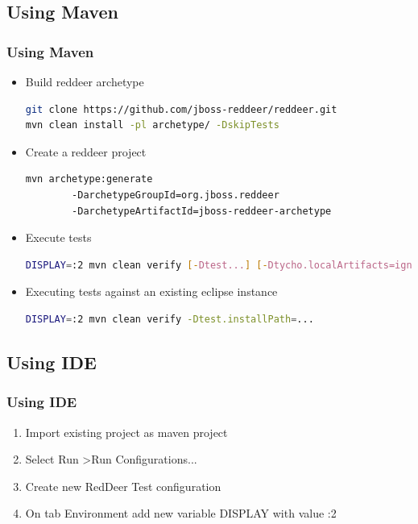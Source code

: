 \documentclass{beamer}
\begin{document}
\subsection{Using Maven}
\begin{frame}[fragile]
\frametitle{Using Maven}
\begin{itemize}
\item Build reddeer archetype
\begin{lstlisting}[language=sh]
git clone https://github.com/jboss-reddeer/reddeer.git
mvn clean install -pl archetype/ -DskipTests
\end{lstlisting}
\item Create a reddeer project
\begin{lstlisting}[language=sh]
mvn archetype:generate 
        -DarchetypeGroupId=org.jboss.reddeer
        -DarchetypeArtifactId=jboss-reddeer-archetype
\end{lstlisting}
\item Execute tests
\begin{lstlisting}[language=sh]
DISPLAY=:2 mvn clean verify [-Dtest...] [-Dtycho.localArtifacts=ignore]
\end{lstlisting}
\item Executing tests against an existing eclipse instance
\begin{lstlisting}[language=sh]
DISPLAY=:2 mvn clean verify -Dtest.installPath=...
\end{lstlisting}
\end{itemize}
\end{frame}

\subsection{Using IDE}
\begin{frame}[fragile]
\frametitle{Using IDE}
\begin{enumerate}
\item Import existing project as maven project
\item Select Run \textgreater Run Configurations...
\item Create new RedDeer Test configuration
\item On tab Environment add new variable DISPLAY with value :2
\end{enumerate}
\end{frame}
\end{document}

